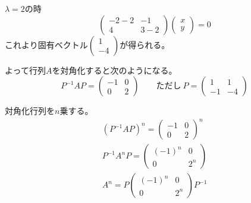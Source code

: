 \documentclass[12pt,b5paper]{ltjsarticle}
\begin{document}
\begin{enumerate}
      $\lambda=2$の時
      \begin{equation}
       \begin{pmatrix}-2-2 & -1\\ 4 & 3-2\end{pmatrix}
       \begin{pmatrix}x\\y\end{pmatrix}
       =0
      \end{equation}
      これより固有ベクトル$\begin{pmatrix}1\\-4\end{pmatrix}$が得られる。

      よって行列$A$を対角化すると次のようになる。
      \begin{equation}
       P^{-1}AP=
        \begin{pmatrix}-1 & 0\\ 0 & 2\end{pmatrix}
        \qquad
         ただし\
         P=
         \begin{pmatrix}1 & 1\\ -1 & -4\end{pmatrix}
      \end{equation}

      対角化行列を$n$乗する。
      \begin{gather}
       (P^{-1}AP)^n=\begin{pmatrix}-1 & 0\\ 0 & 2\end{pmatrix}^n\\
       P^{-1}A^nP=\begin{pmatrix}(-1)^n & 0\\ 0 & 2^n\end{pmatrix}\\
       A^n=P\begin{pmatrix}(-1)^n & 0\\ 0 & 2^n\end{pmatrix}P^{-1}
      \end{gather}


\end{enumerate}
\end{document}
